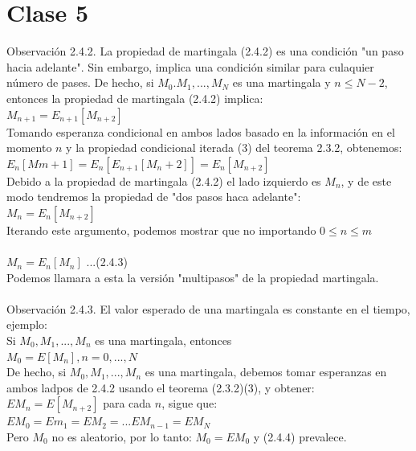\documentclass{article}
\begin{document}
        \section{Clase 5}
        Observación 2.4.2. La propiedad de martingala (2.4.2) es una condición "un paso hacia adelante". Sin embargo, implica
        una condición similar para culaquier número de pases. De hecho, si $M_0. M_1, ..., M_N$ es una martingala y $n \le N-2$,
        entonces la propiedad de martingala (2.4.2) implica:
        \\
        $M_{n+1} = E_{n+1}[M_{n+2}]$
        \\
        Tomando esperanza condicional en ambos lados basado en la información en el momento $n$
        y la propiedad condicional iterada (3) del teorema 2.3.2, obtenemos:
        \\
        $E_n[M{m+1}] = E_n[E_{n+1}[M_n+2]] = E_n[M_{n+2}]$
        \\
        Debido a la propiedad de martingala (2.4.2) el lado izquierdo es $M_n$, y de este modo tendremos la propiedad de "dos pasos haca adelante":
        \\
        $M_n = E_n[M_{n+2}]$
        \\
        Iterando este argumento, podemos mostrar que no importando $0 \le n \le m$
        \\
        \\
        $M_n = E_n[M_n]$ ...(2.4.3)
        \\
        Podemos llamara a esta la versión "multipasos" de la propiedad martingala.
        \\
        \\
        Observación 2.4.3. El valor esperado de una martingala es constante en el tiempo, ejemplo:
        \\
        Si $M_0, M_1, ..., M_n$ es una martingala, entonces
        \\
        $M_0 = E[M_n], n=0,...,N$
        \\
        De hecho, si $M_0, M_1, ..., M_n$ es una martingala, debemos tomar esperanzas en ambos ladpos de 2.4.2 usando el teorema (2.3.2)(3),
        y obtener:
        \\
        $EM_n = E[M_{n+2}]$ para cada $n$, sigue que:
        \\
        $EM_0 = Em_1 = EM_2 = ... EM_{n-1} = EM_N$
        \\
        Pero $M_0$ no es aleatorio, por lo tanto: $M_0 = EM_0$ y (2.4.4) prevalece.
        \\
\end{document}
